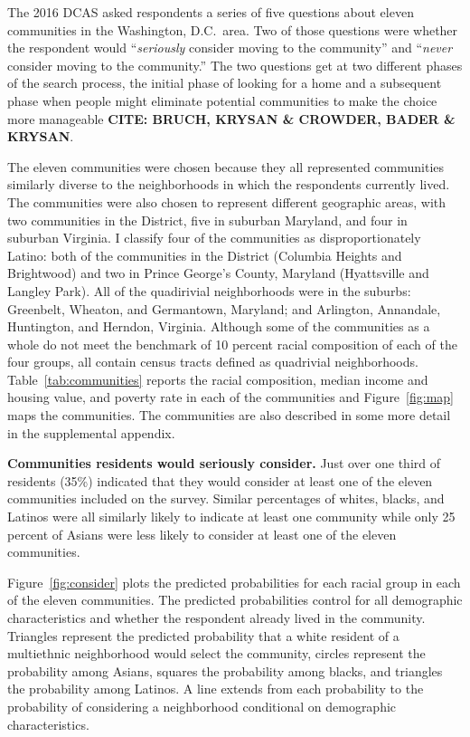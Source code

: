 \documentclass[11pt]{baderart}
\begin{document}
The 2016 DCAS asked respondents a series of five questions about eleven communities in the Washington, D.C.\ area. Two of those questions were whether the respondent would ``\emph{seriously} consider moving to the community'' and ``\emph{never} consider moving to the community.'' The two questions get at two different phases of the search process, the initial phase of looking for a home and a subsequent phase when people might eliminate potential communities to make the choice more manageable \textbf{CITE: BRUCH, KRYSAN \& CROWDER, BADER \& KRYSAN}. 

The eleven communities were chosen because they all represented communities similarly diverse to the neighborhoods in which the respondents currently lived. The communities were also chosen to represent different geographic areas, with two communities in the District, five in suburban Maryland, and four in suburban Virginia. I classify four of the communities as disproportionately Latino: both of the communities in the District (Columbia Heights and Brightwood) and two in Prince George's County, Maryland (Hyattsville and Langley Park). All of the quadirivial neighborhoods were in the suburbs: Greenbelt, Wheaton, and Germantown, Maryland; and Arlington, Annandale, Huntington, and Herndon, Virginia. Although some of the communities as a whole do not meet the benchmark of 10 percent racial composition of each of the four groups, all contain census tracts defined as quadrivial neighborhoods. Table~\ref{tab:communities} reports the racial composition, median income and housing value, and poverty rate in each of the communities and Figure~\ref{fig:map} maps the communities. The communities are also described in some more detail in the supplemental appendix. 



\textbf{Communities residents would seriously consider.} Just over one third of residents (35\%) indicated that they would consider at least one of the eleven communities included on the survey. Similar percentages of whites, blacks, and Latinos were all similarly likely to indicate at least one community while only 25 percent of Asians were less likely to consider at least one of the eleven communities. 

Figure~\ref{fig:consider} plots the predicted probabilities for each racial group in each of the eleven communities. The predicted probabilities control for all demographic characteristics and whether the respondent already lived in the community. Triangles represent the predicted probability that a white resident of a multiethnic neighborhood would select the community, circles represent the probability among Asians, squares the probability among blacks, and triangles the probability among Latinos. A line extends from each probability to the probability of considering a neighborhood conditional on demographic characteristics. 
\end{document}
